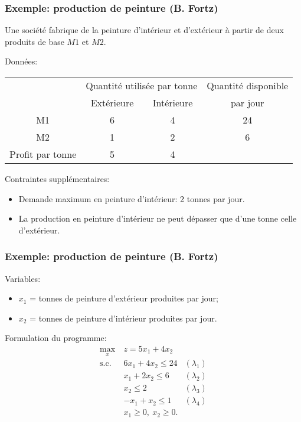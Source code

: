 \documentclass[usepdftitle=false]{beamer}
\begin{document}
\begin{frame}
	\frametitle{Exemple: production de peinture (B. Fortz)}
	
	Une société fabrique de la peinture d'intérieur et d'extérieur à partir de deux
	produits de base $M1$ et $M2$.
	
	\mbox{}
	
	Données:
	\begin{tabular}{cccc}
		& \multicolumn{2}{c}{Quantité utilisée par tonne}
		& Quantité disponible \\
		& Extérieure & Intérieure &  par jour \\
		\hline
		M1 & 6 & 4 & 24 \\
		M2 & 1 & 2 & 6 \\
		\hline
		Profit par tonne & 5 & 4
	\end{tabular}
	
	\mbox{}
	
	Contraintes supplémentaires:
	\begin{itemize}
		\item
		Demande maximum en peinture d’intérieur: 2 tonnes par jour.
		\item
		La production en peinture d'intérieur ne peut dépasser que d’une tonne celle d'extérieur.
	\end{itemize}
	
\end{frame}

\begin{frame}
	\frametitle{Exemple: production de peinture (B. Fortz)}
	
	Variables:
	\begin{itemize}
		\item
		$x_1$ = tonnes de peinture d’extérieur produites par jour;
		\item
		$x_2$ = tonnes de peinture d’intérieur produites par jour.
	\end{itemize}
	
	\mbox{}
	
	Formulation du programme:
	\begin{align*}
		\max_x \ & z = 5x_1 + 4x_2 \\
		\mbox{s.c. } & 6x_1 + 4x_2 \leq 24 & (\lambda_1) \\
		& x_1 + 2x_2 \leq 6 & (\lambda_2) \\
		& x_2 \leq 2 & (\lambda_3) \\
		& -x_1 + x_2 \leq 1 & (\lambda_4) \\
		& x_1 \geq 0,\ x_2 \geq 0.
	\end{align*}
	
\end{frame}
\end{document}

